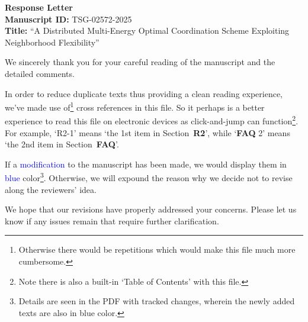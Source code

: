 \documentclass[11pt]{article}
\newcommand{\blue}[1]{\textcolor{blue}{#1}}
\begin{document}
\begin{center}
    {\Large \textbf{Response Letter}}\\[1ex]
    \textbf{Manuscript ID:} TSG-02572-2025\\
    \textbf{Title:} ``A Distributed Multi-Energy Optimal Coordination Scheme Exploiting Neighborhood Flexibility''
\end{center}

We sincerely thank you for your careful reading of the manuscript and the detailed comments.
\par
In order to reduce duplicate texts thus providing a clean reading experience, we've made use of\footnote{Otherwise there would be repetitions which would make this file much more cumbersome.} cross references in this file.
So it perhaps is a better experience to read this file on electronic devices
as click-and-jump can function\footnote{Note there is also a built-in `Table of Contents' with this file.}.
For example, `R2-1' means `the 1st item in Section~\textbf{R2}', while `\textbf{FAQ} 2' means `the 2nd item in Section~\textbf{FAQ}'.
\par
If a \blue{modification} to the manuscript has been made, we would display them in \blue{blue} color\footnote{Details are seen in the PDF with tracked changes, wherein the newly added texts are also in blue color.}. Otherwise, we will expound the reason why we decide not to revise along the reviewers' idea.
\par
We hope that our revisions have properly addressed your concerns.
Please let us know if any issues remain that require further clarification.
\end{document}
